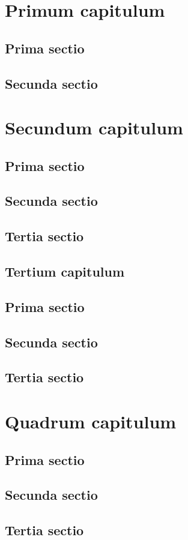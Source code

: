 \documentclass[12pt,a4paper]%
    {report}
\begin{document}
\dominitoc
\tableofcontents
\chapter{Primum capitulum}
\begin{multicols}{2}[\minitoc]
\section{Prima sectio}
\lipsum[1-2]
\section{Secunda sectio}
\lipsum[3-4]
\end{multicols}
\chapter{Secundum capitulum}
\begin{multicols}{2}[\minitoc]
\section{Prima sectio}
\lipsum[5-6]
\section{Secunda sectio}
\lipsum[7-8]
\section{Tertia sectio}
\lipsum[9-10]
\end{multicols}
\begin{multicols}{2}
\chapter{Tertium capitulum}
\minitoc
\section{Prima sectio}
\lipsum[11-12]
\section{Secunda sectio}
\lipsum[13-14]
\section{Tertia sectio}
\lipsum[15-16]
\end{multicols}
\chapter{Quadrum capitulum}
\begin{multicols}{2}
\minitoc
\section{Prima sectio}
\lipsum[16-17]
\section{Secunda sectio}
\lipsum[18-19]
\section{Tertia sectio}
\lipsum[20-21]
\end{multicols}
\end{document}
